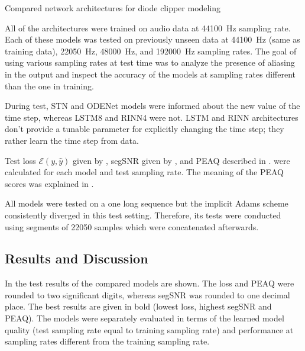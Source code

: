 \begin{table}[]
    \caption{Compared network architectures for diode clipper modeling}
    
    \label{tab:diode_clipper_models_data}
\end{table}

All of the architectures were trained on audio data at \SI{44100}{Hz} sampling rate. Each of these models was tested on previously unseen data at \SI{44100}{Hz} (same as training data), \SI{22050}{Hz}, \SI{48000}{Hz}, and \SI{192000}{Hz} sampling rates. The goal of using various sampling rates at test time was to analyze the presence of aliasing in the output and inspect the accuracy of the models at sampling rates different than the one in training. 

During test, \ac{STN} and ODENet models were informed about the new value of the time step, whereas \ac{LSTM}8 and \ac{RINN}4 were not. \ac{LSTM} and \ac{RINN} architectures don't provide a tunable parameter for explicitly changing the time step; they rather learn the time step from data.

Test loss $\mathcal{E}(y, \hat{y})$ given by , \ac{segSNR} given by , and \ac{PEAQ} described in .
were calculated for each model and test sampling rate. The meaning of the \ac{PEAQ} scores was explained in .

All models were tested on a one long sequence but the implicit Adams scheme consistently diverged in this test setting. Therefore, its tests were conducted using segments of 22050 samples which were concatenated afterwards.

\subsection{Results and Discussion}
\label{sec:diode_clipper_results}

In  the test results of the compared models are shown. The loss and \ac{PEAQ} were rounded to two significant digits, whereas \ac{segSNR} was rounded to one decimal place. The best results are given in bold (lowest loss, highest \ac{segSNR} and \ac{PEAQ}). The models were separately evaluated in terms of the learned model quality (test sampling rate equal to training sampling rate) and performance at sampling rates different from the training sampling rate. 


